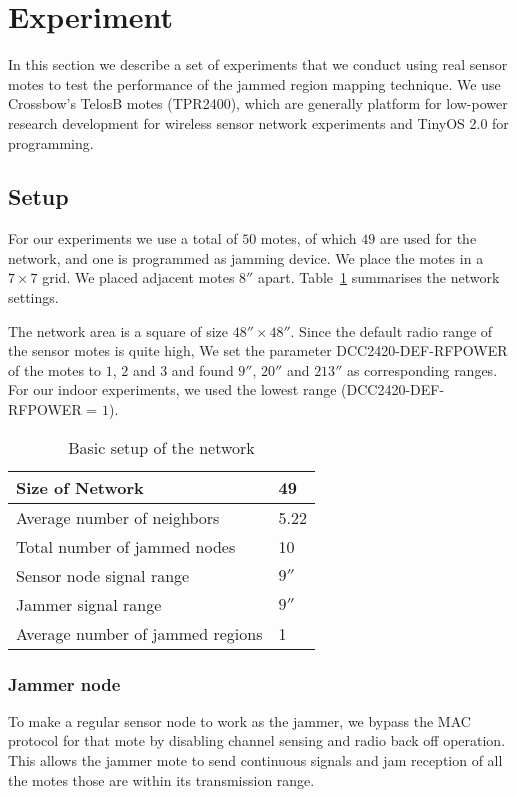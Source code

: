 \documentclass[conference]{IEEEtran}
\begin{document}
\section{Experiment}
\label{exp}

In this section we describe a set of experiments that we conduct using real sensor motes to test the performance of the jammed region mapping technique. We use Crossbow's TelosB motes (TPR2400), which are generally platform for low-power research development for wireless sensor network experiments and TinyOS 2.0 for programming.


\subsection{Setup}

For our experiments we use a total of $50$ motes, of which $49$ are used for the network, and one is programmed as jamming device.
We place the motes in a $7 \times 7$ grid. We placed adjacent motes $8''$ apart. Table~\ref{exp_env} summarises the network settings.

The network area is a square of size $48'' \times 48''$. Since the default radio range of the sensor motes is quite high, We set the parameter DCC2420-DEF-RFPOWER of the motes to $1$, $2$ and $3$ and found $9''$, $20''$ and $213''$ as corresponding ranges. For our indoor experiments, we used the lowest range (DCC2420-DEF-RFPOWER = $1$). 


\begin{table}
\begin{center}
\caption{Basic setup of the network}
\begin{tabular}{ | l | p{1.5cm}|}
\hline
Size of Network & 49\\ \hline Average number of neighbors & 5.22\\ \hline
Total number of jammed nodes & 10\\ \hline
Sensor node signal range & $9''$\\ \hline
Jammer signal range & $9''$\\ \hline
Average number of jammed regions & 1\\ \hline
\end{tabular}
\label{exp_env}
\end{center}
\end{table}


\subsubsection{Jammer node}
To make a regular sensor node to work as the jammer, we bypass the MAC protocol for that mote by disabling channel sensing and radio back off operation. This allows the jammer mote to send continuous signals and jam reception of all the motes those are within its transmission range. 
\end{document}
